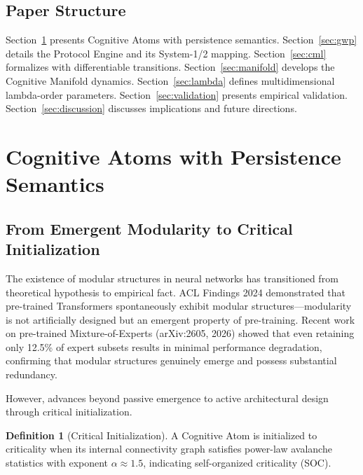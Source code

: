 \documentclass[11pt,a4paper]{article}
\theoremstyle{definition}
\newtheorem{definition}{Definition}[section]
\theoremstyle{remark}
\newcommand{\CAA}{\text{CAA-X}}
\newcommand{\CML}{\text{CML 2.0}}
\newcommand{\GWP}{\text{GWP}}
\begin{document}
\subsection{Paper Structure}\label{subsec:structure}

Section~\ref{sec:cognitive-atoms} presents Cognitive Atoms with persistence semantics. Section~\ref{sec:gwp} details the \GWP{} Protocol Engine and its System-1/2 mapping. Section~\ref{sec:cml} formalizes \CML{} with differentiable transitions. Section~\ref{sec:manifold} develops the Cognitive Manifold dynamics. Section~\ref{sec:lambda} defines multidimensional lambda-order parameters. Section~\ref{sec:validation} presents empirical validation. Section~\ref{sec:discussion} discusses implications and future directions.

\section{Cognitive Atoms with Persistence Semantics}\label{sec:cognitive-atoms}

\subsection{From Emergent Modularity to Critical Initialization}\label{subsec:emergent-modularity}

The existence of modular structures in neural networks has transitioned from theoretical hypothesis to empirical fact. ACL Findings 2024 demonstrated that pre-trained Transformers spontaneously exhibit modular structures---modularity is not artificially designed but an emergent property of pre-training. Recent work on pre-trained Mixture-of-Experts (arXiv:2605, 2026) showed that even retaining only 12.5\% of expert subsets results in minimal performance degradation, confirming that modular structures genuinely emerge and possess substantial redundancy.

However, \CAA{} advances beyond passive emergence to active architectural design through critical initialization.

\begin{definition}[Critical Initialization]\label{def:critical-init}
A Cognitive Atom is initialized to criticality when its internal connectivity graph satisfies power-law avalanche statistics with exponent $\alpha \approx 1.5$, indicating self-organized criticality (SOC).
\end{definition}
\end{document}
